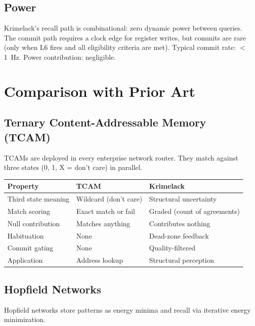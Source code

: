 \documentclass[11pt, a4paper]{article}
\begin{document}
\subsection{Power}

Krimelack's recall path is combinational: zero dynamic power
between queries. The commit path requires a clock edge for
register writes, but commits are rare (only when L6 fires
and all eligibility criteria are met). Typical commit rate:
$<$1~Hz. Power contribution: negligible.

\section{Comparison with Prior Art}

\subsection{Ternary Content-Addressable Memory (TCAM)}

TCAMs are deployed in every enterprise network router. They
match against three states (0, 1, X = don't care) in parallel.

\begin{center}
\begin{tabular}{@{}lll@{}}
\toprule
\textbf{Property} & \textbf{TCAM} & \textbf{Krimelack} \\
\midrule
Third state meaning & Wildcard (don't care) & Structural uncertainty \\
Match scoring & Exact match or fail & Graded (count of agreements) \\
Null contribution & Matches anything & Contributes nothing \\
Habituation & None & Dead-zone feedback \\
Commit gating & None & Quality-filtered \\
Application & Address lookup & Structural perception \\
\bottomrule
\end{tabular}
\end{center}

\subsection{Hopfield Networks}

Hopfield networks store patterns as energy minima and recall
via iterative energy minimization.
\end{document}
